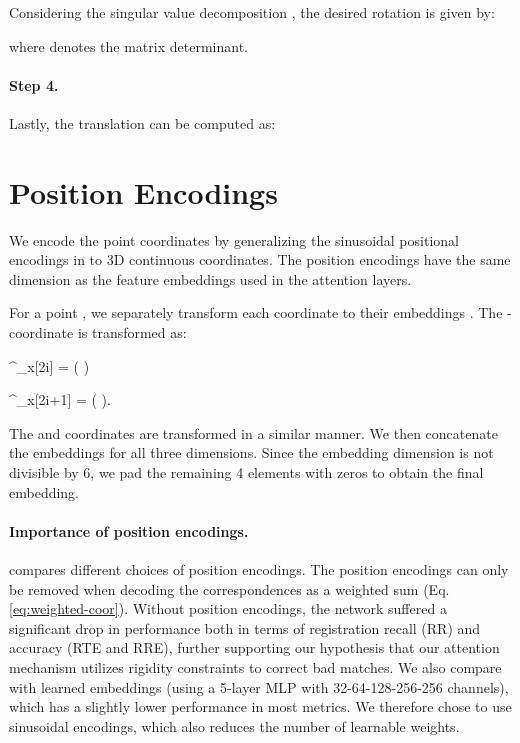 \documentclass[10pt,twocolumn,letterpaper]{article}
\DeclarePairedDelimiter\floor{\lfloor}{\rfloor}
\begin{document}
Considering the singular value decomposition , the desired rotation  is given by:

where  denotes the matrix determinant.

\vspace{-2mm}
\paragraph{Step 4.} Lastly, the translation can be computed as:


\section{Position Encodings}\label{sect:pos-emb-details}
We encode the point coordinates by generalizing the sinusoidal positional encodings in \cite{vaswani2017attention} to 3D continuous coordinates. The position encodings have the same dimension  as the feature embeddings used in the attention layers.

For a point , we separately transform each coordinate to their embeddings . The -coordinate is transformed as:

    ^{}_{x}[2i] = \sin \left(  \right)

    ^{}_{x}[2i+1] = \cos \left(  \right).

The  and  coordinates are transformed in a similar manner. We then concatenate the embeddings for all three dimensions. Since the embedding dimension  is not divisible by 6, we pad the remaining 4 elements with zeros to obtain the final embedding.

\vspace{-2mm}
\paragraph{Importance of position encodings.} 
 compares different choices of position encodings. 
The position encodings can only be removed when decoding the correspondences as a weighted sum (Eq. \ref{eq:weighted-coor}). Without position encodings, the network suffered a significant drop in performance both in terms of registration recall (RR) and accuracy (RTE and RRE), further supporting our hypothesis that our attention mechanism utilizes rigidity constraints to correct bad matches. 
We also compare with learned embeddings (using a 5-layer MLP with 32-64-128-256-256 channels), which has a slightly lower performance in most metrics. We therefore chose to use sinusoidal encodings, which also reduces the number of learnable weights. 
\end{document}
